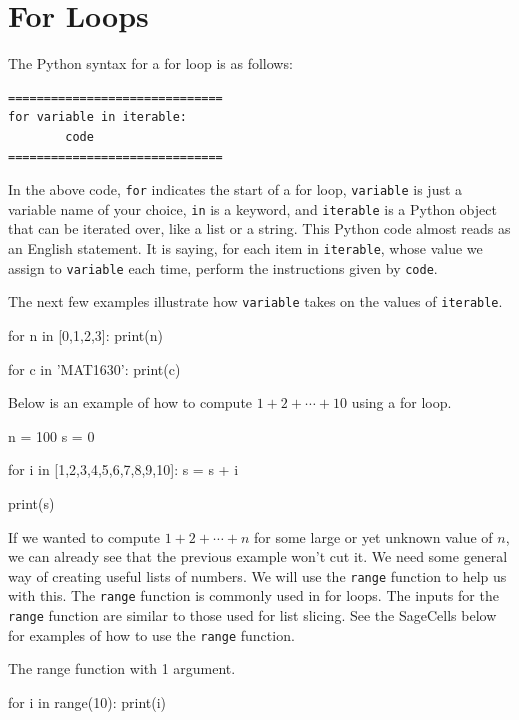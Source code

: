 \documentclass{ximera}
\begin{document}
\section{For Loops}

The Python syntax for a for loop is as follows:

\begin{verbatim}
==============================
for variable in iterable:
        code
==============================
\end{verbatim}

In the above code, \verb|for| indicates the start of a for loop, \verb|variable| is just a variable name of your choice, \verb|in| is a keyword, and \verb|iterable| is a Python object that can be iterated over, like a list or a string. This Python code almost reads as an English statement. It is saying, for each item in \verb|iterable|, whose value we assign to \verb|variable| each time, perform the instructions given by \verb|code|.

The next few examples illustrate how \verb|variable| takes on the values of \verb|iterable|.

\begin{sageCell}
for n in [0,1,2,3]:
        print(n)
\end{sageCell}

\begin{sageCell}
for c in 'MAT1630':
        print(c)
\end{sageCell}

Below is an example of how to compute $1+2+\cdots+10$ using a for loop. 

\begin{sageCell}
n = 100
s = 0

for i in [1,2,3,4,5,6,7,8,9,10]:
        s = s + i

print(s)
\end{sageCell}

If we wanted to compute $1+2+\cdots+n$ for some large or yet unknown value of $n$, we can already see that the previous example won't cut it. We need some general way of creating useful lists of numbers. We will use the \verb|range| function to help us with this. The \verb|range| function is commonly used in for loops. The inputs for the \verb|range| function are similar to those used for list slicing. See the SageCells below for examples of how to use the \verb|range| function.

The range function with 1 argument.
\begin{sageCell}
for i in range(10):
     print(i)
\end{sageCell}
\end{document}
